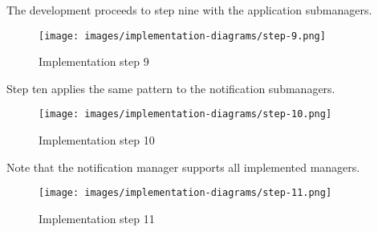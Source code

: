 \newpage
The development proceeds to step nine with the application submanagers.

\begin{figure}[h]
    \centering
    \texttt{[image: images/implementation-diagrams/step-9.png]}
    \caption{Implementation step 9}
\end{figure}

Step ten applies the same pattern to the notification submanagers.

\begin{figure}[h]
    \centering
    \texttt{[image: images/implementation-diagrams/step-10.png]}
    \caption{Implementation step 10}
\end{figure}

\newpage
Note that the notification manager supports all implemented managers.

\begin{figure}[h]
    \centering
    \texttt{[image: images/implementation-diagrams/step-11.png]}
    \caption{Implementation step 11}
\end{figure}
